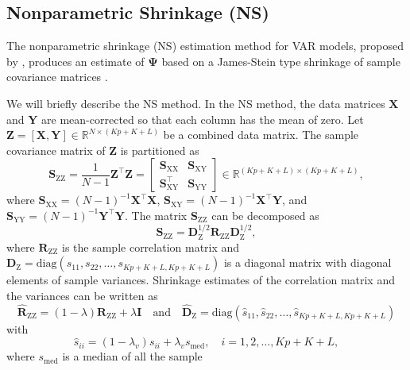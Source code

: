 \documentclass[
]{jss}
\begin{document}
\hypertarget{nonparametric-shrinkage-ns}{%
\subsection{Nonparametric Shrinkage
(NS)}\label{nonparametric-shrinkage-ns}}

The nonparametric shrinkage (NS) estimation method for VAR models,
proposed by \citet{Rhein07c}, produces an estimate of \(\mathbf{\Psi}\)
based on a James-Stein type shrinkage of sample covariance matrices
\citep{Rhein07a, Schafer05b}.

We will briefly describe the NS method. In the NS method, the data
matrices \(\mathbf{X}\) and \(\mathbf{Y}\) are mean-corrected so that
each column has the mean of zero. Let
\(\mathbf{Z} = [\mathbf{X}, \mathbf{Y}] \in \mathbb{R}^{N \times (Kp + K + L)}\)
be a combined data matrix. The sample covariance matrix of
\(\mathbf{Z}\) is partitioned as \begin{equation}
    \mathbf{S}_\text{ZZ} = \frac{1}{N - 1} \mathbf{Z}^\top \mathbf{Z} =
    \begin{bmatrix} \mathbf{S}_\text{XX} & \mathbf{S}_\text{XY} \\
    \mathbf{S}_\text{XY}^\top & \mathbf{S}_\text{YY}
    \end{bmatrix}
    \in \mathbb{R}^{(Kp + K + L) \times (Kp + K + L)},
    \end{equation} where
\(\mathbf{S}_\text{XX} = (N - 1)^{-1} \mathbf{X}^\top \mathbf{X}\),
\(\mathbf{S}_\text{XY} = (N - 1)^{-1} \mathbf{X}^\top \mathbf{Y}\), and
\(\mathbf{S}_\text{YY} = (N - 1)^{-1} \mathbf{Y}^\top \mathbf{Y}\). The
matrix \(\mathbf{S}_\text{ZZ}\) can be decomposed as \begin{equation}
    \mathbf{S}_\text{ZZ} = \mathbf{D}_\text{Z}^{1/2} \mathbf{R}_\text{ZZ} \mathbf{D}_\text{Z}^{1/2},
    \end{equation} where \(\mathbf{R}_\text{ZZ}\) is the sample
correlation matrix and
\(\mathbf{D}_\text{Z} = \text{diag}(s_{11}, s_{22}, \ldots, s_{Kp + K + L, Kp + K + L})\)
is a diagonal matrix with diagonal elements of sample variances.
Shrinkage estimates of the correlation matrix and the variances can be
written as \begin{equation}
    \widehat{\mathbf{R}}_\text{ZZ} =
    (1-\lambda) \mathbf{R}_\text{ZZ} + \lambda \mathbf{I}
    \quad
    \text{and}
    \quad
    \widehat{\mathbf{D}}_\text{Z} =
    \text{diag}(\hat{s}_{11}, \hat{s}_{22}, \ldots, \hat{s}_{Kp+K+L,Kp+K+L})
    \end{equation} with \begin{equation}
    \hat{s}_{ii} = (1-\lambda_v) s_{ii} + \lambda_v s_\text{med},
    \quad i = 1, 2, \ldots, Kp + K + L,
    \end{equation} where \(s_\text{med}\) is a median of all the sample
\end{document}

